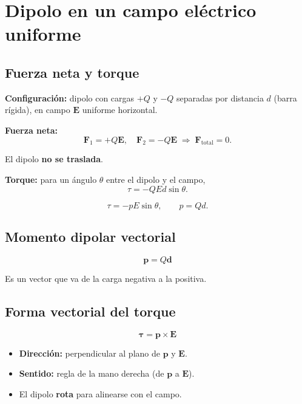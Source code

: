\documentclass[12pt,a4paper]{article}
\begin{document}
\section{Dipolo en un campo eléctrico uniforme}

\subsection{Fuerza neta y torque}

\textbf{Configuración:} dipolo con cargas $+Q$ y $-Q$ separadas por
distancia $d$ (barra rígida), en campo $\mathbf{E}$ uniforme
horizontal.

\textbf{Fuerza neta:}
\[
\mathbf{F}_1 = +Q\mathbf{E},\quad \mathbf{F}_2 = -Q\mathbf{E}
\;\Longrightarrow\; \mathbf{F}_{\text{total}} = 0.
\]

El dipolo \textbf{no se traslada}.

\textbf{Torque:} para un ángulo $\theta$ entre el dipolo y el campo,
\[
\tau = -Q E d \sin\theta .
\]

\begin{keybox}
  \[
  \boxed{\tau = -p E \sin\theta},
  \qquad p = Qd .
  \]
\end{keybox}

\subsection{Momento dipolar vectorial}

\[
\boxed{\mathbf{p} = Q \mathbf{d}}
\]

Es un vector que va de la carga negativa a la positiva.

\subsection{Forma vectorial del torque}

\[
\boxed{\boldsymbol{\tau} = \mathbf{p} \times \mathbf{E}}
\]

\begin{itemize}[nosep]
  \item \textbf{Dirección:} perpendicular al plano de $\mathbf{p}$ y
        $\mathbf{E}$.
  \item \textbf{Sentido:} regla de la mano derecha (de $\mathbf{p}$
        a $\mathbf{E}$).
  \item El dipolo \textbf{rota} para alinearse con el campo.
\end{itemize}
\end{document}

